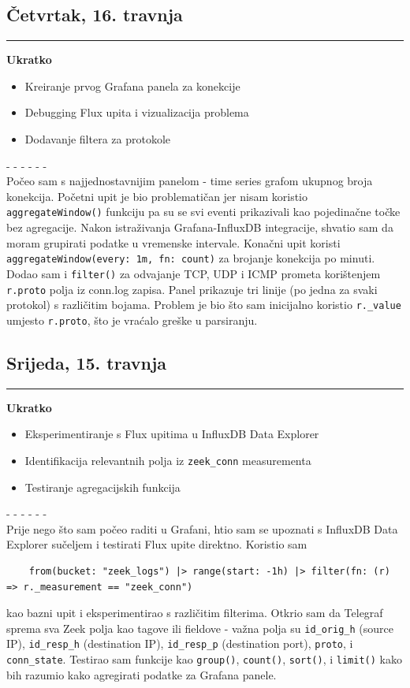 \documentclass[12pt, a4paper]{article}
\newcommand{\dan}[1]{
    \subsection*{#1}
    \vspace{-0.5em} 
    \hrule \vspace{0.5em} 
}
\begin{document}
\dan{Četvrtak, 16. travnja}
\textbf{Ukratko}
\begin{itemize}
    \item Kreiranje prvog Grafana panela za konekcije
    \item Debugging Flux upita i vizualizacija problema
    \item Dodavanje filtera za protokole
\end{itemize}
- - - - - - \\
Počeo sam s najjednostavnijim panelom - time series grafom ukupnog broja konekcija. Početni upit je bio problematičan jer nisam 
koristio \lstinline|aggregateWindow()| funkciju pa su se svi eventi prikazivali kao pojedinačne točke bez agregacije. Nakon istraživanja 
Grafana-InfluxDB integracije, shvatio sam da moram grupirati podatke u vremenske intervale. Konačni upit koristi 
\lstinline|aggregateWindow(every: 1m, fn: count)| za brojanje konekcija po minuti. Dodao sam i \lstinline|filter()| za odvajanje TCP, UDP 
i ICMP prometa korištenjem \lstinline|r.proto| polja iz conn.log zapisa. Panel prikazuje tri linije (po jedna za svaki protokol) s 
različitim bojama. Problem je bio što sam inicijalno koristio \lstinline|r._value| umjesto \lstinline|r.proto|, što je vraćalo greške u 
parsiranju.

\dan{Srijeda, 15. travnja}
\textbf{Ukratko}
\begin{itemize}
    \item Eksperimentiranje s Flux upitima u InfluxDB Data Explorer
    \item Identifikacija relevantnih polja iz \lstinline|zeek_conn| measurementa
    \item Testiranje agregacijskih funkcija
\end{itemize}
- - - - - - \\
Prije nego što sam počeo raditi u Grafani, htio sam se upoznati s InfluxDB Data Explorer sučeljem i testirati Flux upite direktno. 
Koristio sam 
\begin{lstlisting}
    from(bucket: "zeek_logs") |> range(start: -1h) |> filter(fn: (r) => r._measurement == "zeek_conn")
\end{lstlisting}
kao bazni upit i eksperimentirao s različitim filterima. Otkrio sam da Telegraf sprema sva Zeek polja kao tagove ili fieldove - važna polja su 
\lstinline|id_orig_h| (source IP), \lstinline|id_resp_h| (destination IP), \lstinline|id_resp_p| (destination port), 
\lstinline|proto|, i \lstinline|conn_state|. Testirao sam funkcije kao \lstinline|group()|, \lstinline|count()|, \lstinline|sort()|, 
i \lstinline|limit()| kako bih razumio kako agregirati podatke za Grafana panele. 
\end{document}
